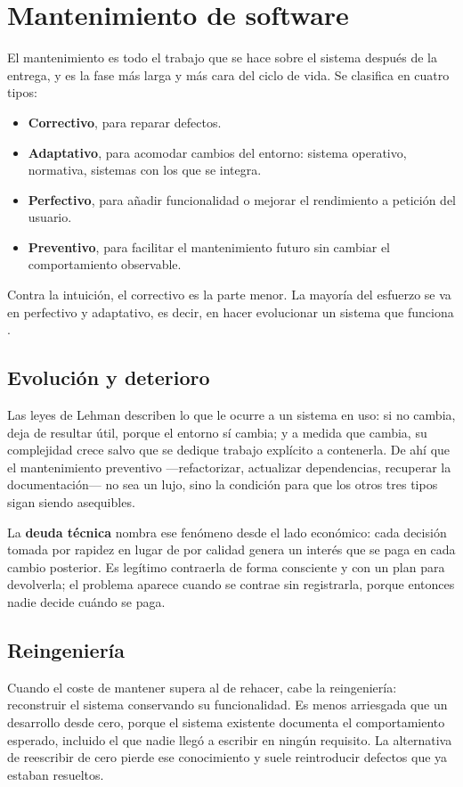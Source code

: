 \section{Mantenimiento de software}

El mantenimiento es todo el trabajo que se hace sobre el sistema después de la
entrega, y es la fase más larga y más cara del ciclo de vida. Se clasifica en
cuatro tipos:

\begin{itemize}
    \item \textbf{Correctivo}, para reparar defectos.
    \item \textbf{Adaptativo}, para acomodar cambios del entorno: sistema
          operativo, normativa, sistemas con los que se integra.
    \item \textbf{Perfectivo}, para añadir funcionalidad o mejorar el rendimiento a
          petición del usuario.
    \item \textbf{Preventivo}, para facilitar el mantenimiento futuro sin cambiar
          el comportamiento observable.
\end{itemize}

Contra la intuición, el correctivo es la parte menor. La mayoría del esfuerzo se
va en perfectivo y adaptativo, es decir, en hacer evolucionar un sistema que
funciona \cite{sommerville2016}.

\subsection*{Evolución y deterioro}

Las leyes de Lehman describen lo que le ocurre a un sistema en uso: si no cambia,
deja de resultar útil, porque el entorno sí cambia; y a medida que cambia, su
complejidad crece salvo que se dedique trabajo explícito a contenerla. De ahí que
el mantenimiento preventivo —refactorizar, actualizar dependencias, recuperar la
documentación— no sea un lujo, sino la condición para que los otros tres tipos
sigan siendo asequibles.

La \textbf{deuda técnica} nombra ese fenómeno desde el lado económico: cada
decisión tomada por rapidez en lugar de por calidad genera un interés que se paga
en cada cambio posterior. Es legítimo contraerla de forma consciente y con un plan
para devolverla; el problema aparece cuando se contrae sin registrarla, porque
entonces nadie decide cuándo se paga.

\subsection*{Reingeniería}

Cuando el coste de mantener supera al de rehacer, cabe la reingeniería: reconstruir
el sistema conservando su funcionalidad. Es menos arriesgada que un desarrollo
desde cero, porque el sistema existente documenta el comportamiento esperado,
incluido el que nadie llegó a escribir en ningún requisito. La alternativa de
reescribir de cero pierde ese conocimiento y suele reintroducir defectos que ya
estaban resueltos.
